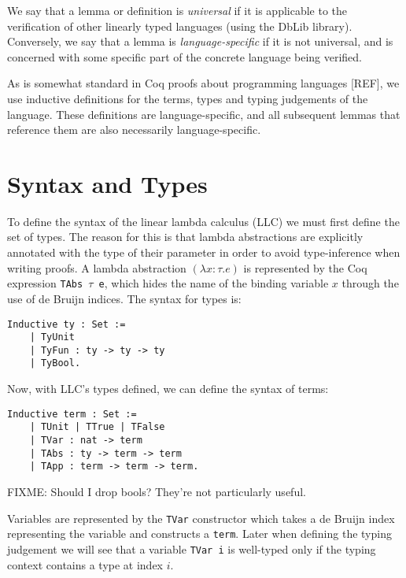 \documentclass[]{unswthesis}
\let\c\texttt
\let\i\textit
\begin{document}
We say that a lemma or definition is \i{universal} if it is applicable to the verification of other linearly typed languages (using the DbLib library). Conversely, we say that a lemma is \i{language-specific} if it is not universal, and is concerned with some specific part of the concrete language being verified.

As is somewhat standard in Coq proofs about programming languages [REF], we use inductive definitions for the terms, types and typing judgements of the language. These definitions are language-specific, and all subsequent lemmas that reference them are also necessarily language-specific.


\section{Syntax and Types}

To define the syntax of the linear lambda calculus (LLC) we must first define the set of types. The reason for this is that lambda abstractions are explicitly annotated with the type of their parameter in order to avoid type-inference when writing proofs. A lambda abstraction $(\lambda x : \tau. e)$ is represented by the Coq expression \c{TAbs $\tau$ e}, which hides the name of the binding variable $x$ through the use of de Bruijn indices. The syntax for types is:

\begin{verbatim}
Inductive ty : Set :=
    | TyUnit
    | TyFun : ty -> ty -> ty
    | TyBool.
\end{verbatim}

Now, with LLC's types defined, we can define the syntax of terms:

\begin{verbatim}
Inductive term : Set :=
    | TUnit | TTrue | TFalse
    | TVar : nat -> term
    | TAbs : ty -> term -> term
    | TApp : term -> term -> term.
\end{verbatim}

FIXME: Should I drop bools? They're not particularly useful.

Variables are represented by the \c{TVar} constructor which takes a de Bruijn index representing the variable and constructs a \c{term}. Later when defining the typing judgement we will see that a variable \c{TVar i} is well-typed only if the typing context contains a type at index $i$.
\end{document}
